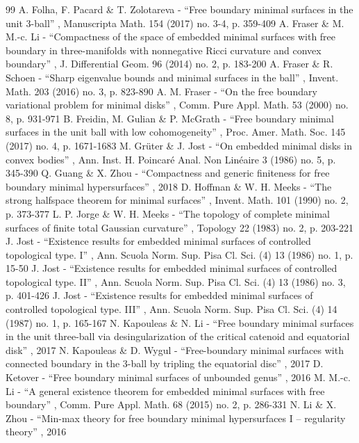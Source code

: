 \begin{thebibliography}{99}
 A. Folha, F. Pacard \& T. Zolotareva - “Free boundary minimal surfaces in the unit 3-ball” , Manuscripta Math. 154 (2017) no. 3-4, p. 359-409
 A. Fraser \& M. M.-c. Li - “Compactness of the space of embedded minimal surfaces with free boundary in three-manifolds with nonnegative Ricci curvature and convex boundary” , J. Differential Geom. 96 (2014) no. 2, p. 183-200
 A. Fraser \& R. Schoen - “Sharp eigenvalue bounds and minimal surfaces in the ball” , Invent. Math. 203 (2016) no. 3, p. 823-890
 A. M. Fraser - “On the free boundary variational problem for minimal disks” , Comm. Pure Appl. Math. 53 (2000) no. 8, p. 931-971
 B. Freidin, M. Gulian \& P. McGrath - “Free boundary minimal surfaces in the unit ball with low cohomogeneity” , Proc. Amer. Math. Soc. 145 (2017) no. 4, p. 1671-1683
 M. Grüter \& J. Jost - “On embedded minimal disks in convex bodies” , Ann. Inst. H. Poincaré Anal. Non Linéaire 3 (1986) no. 5, p. 345-390
 Q. Guang \& X. Zhou - “Compactness and generic finiteness for free boundary minimal hypersurfaces” , 2018
 D. Hoffman \& W. H. Meeks - “The strong halfspace theorem for minimal surfaces” , Invent. Math. 101 (1990) no. 2, p. 373-377
 L. P. Jorge \& W. H. Meeks - “The topology of complete minimal surfaces of finite total Gaussian curvature” , Topology 22 (1983) no. 2, p. 203-221
 J. Jost - “Existence results for embedded minimal surfaces of controlled topological type. I” , Ann. Scuola Norm. Sup. Pisa Cl. Sci. (4) 13 (1986) no. 1, p. 15-50
 J. Jost - “Existence results for embedded minimal surfaces of controlled topological type. II” , Ann. Scuola Norm. Sup. Pisa Cl. Sci. (4) 13 (1986) no. 3, p. 401-426
 J. Jost - “Existence results for embedded minimal surfaces of controlled topological type. III” , Ann. Scuola Norm. Sup. Pisa Cl. Sci. (4) 14 (1987) no. 1, p. 165-167
 N. Kapouleas \& N. Li - “Free boundary minimal surfaces in the unit three-ball via desingularization of the critical catenoid and equatorial disk” , 2017
 N. Kapouleas \& D. Wygul - “Free-boundary minimal surfaces with connected boundary in the 3-ball by tripling the equatorial disc” , 2017
 D. Ketover - “Free boundary minimal surfaces of unbounded genus” , 2016
 M. M.-c. Li - “A general existence theorem for embedded minimal surfaces with free boundary” , Comm. Pure Appl. Math. 68 (2015) no. 2, p. 286-331
 N. Li \& X. Zhou - “Min-max theory for free boundary minimal hypersurfaces I – regularity theory” , 2016

\end{thebibliography}
